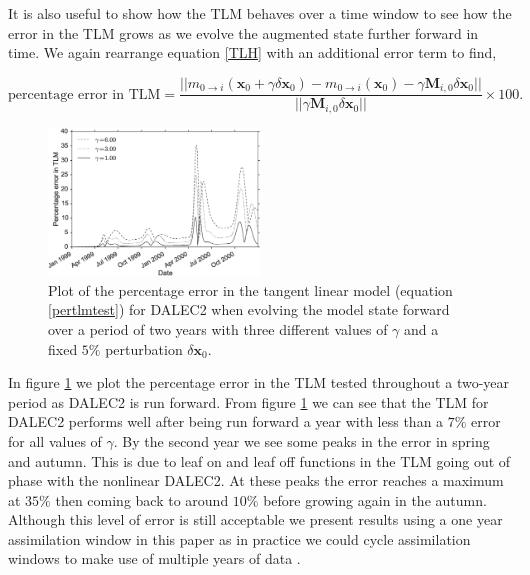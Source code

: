 \documentclass[review]{elsarticle}
\begin{document}
It is also useful to show how the TLM behaves over a time window to see how the error in the TLM grows as we evolve the augmented state further forward in time. We again rearrange equation \eqref{TLH} with an additional error term to find, 
\begin{linenomath}
\begin{equation}
\text{percentage error in TLM} =  \frac{||m_{0\rightarrow i}(\mathbf{x}_0+\gamma \delta\mathbf{x}_0) - m_{0 \rightarrow i}(\mathbf{x}_0) - \gamma\mathbf{M}_{i,0}  \delta\mathbf{x}_0||}{|| \gamma\mathbf{M}_{i,0}  \delta\mathbf{x}_0||} \times 100. \label{pertlmtest}
\end{equation}
\end{linenomath}

\begin{figure}[ht]
    \centering
    \includegraphics[width=0.5\textwidth]{percenterrlinmod.eps}
    \caption{Plot of the percentage error in the tangent linear model (equation \eqref{pertlmtest}) for DALEC2 when evolving the model state forward over a period of two years with three different values of $\gamma$ and a fixed $5\%$ perturbation $\delta \textbf{x}_0$.}
    \label{fig:tlm_error}
\end{figure}

In figure \ref{fig:tlm_error} we plot the percentage error in the TLM tested throughout a two-year period as DALEC2 is run forward. From figure \ref{fig:tlm_error} we can see that the TLM for DALEC2 performs well after being run forward a year with less than a $7\%$ error for all values of $\gamma$. By the second year we see some peaks in the error in spring and autumn. This is due to leaf on and leaf off functions in the TLM going out of phase with the nonlinear DALEC2. At these peaks the error reaches a maximum at $35\%$ then coming back to around $10\%$ before growing again in the autumn. Although this level of error is still acceptable we present results using a one year assimilation window in this paper as in practice we could cycle assimilation windows to make use of multiple years of data \citep{moodycycled4dvar}.
\end{document}
